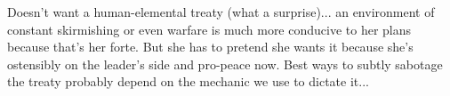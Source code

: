 \documentclass[char]{elementals}
\begin{document}
\name{\cDema{}}

 Doesn’t want a human-elemental treaty (what a surprise)... an environment of constant skirmishing or even warfare is much more conducive to her plans because that’s her forte. But she has to pretend she wants it because she’s ostensibly on the leader’s side and pro-peace now. Best ways to subtly sabotage the treaty probably depend on the mechanic we use to dictate it...
\end{document}

